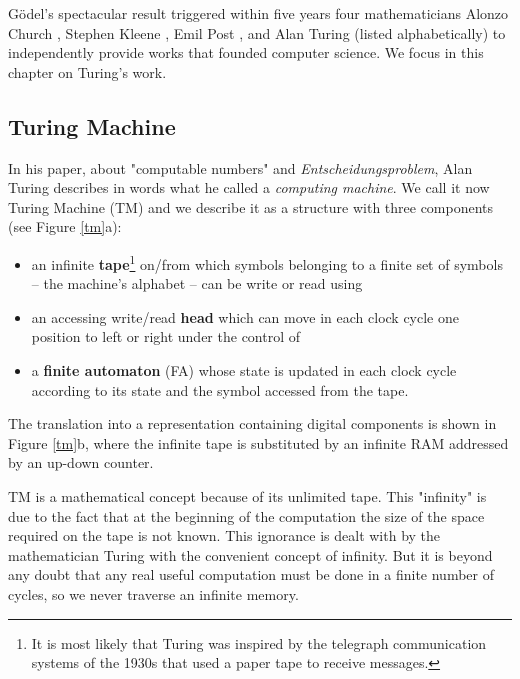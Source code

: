 Gödel's spectacular result triggered within five years four mathematicians Alonzo Church \cite{Church36}, Stephen Kleene \cite{Kleene36}, Emil Post \cite{Post36}, and Alan Turing \cite{Turing36, Turing1937} (listed alphabetically) to independently provide works that founded computer science. We focus in this chapter on Turing's work.

\subsection{Turing Machine}

In his paper, about "computable numbers" and {\em Entscheidungsproblem}, Alan Turing describes in words what he called a {\em computing machine}. We call it now Turing Machine (TM) and we describe it as a structure with three components (see Figure \ref{tm}a):
\begin{itemize}
    \item an infinite {\bf tape}\footnote{It is most likely that Turing was inspired by the telegraph communication systems of the 1930s that used a paper tape to receive messages.}  on/from which symbols belonging to a finite set of symbols -- the machine's alphabet -- can be write or read using
    \item an accessing write/read {\bf head} which can move in each clock cycle one position to left or right under the control of
    \item a {\bf finite automaton} (FA) whose state is updated in each clock cycle according to its state and the symbol accessed from the tape.
\end{itemize}
The translation into a representation containing digital components is shown in Figure \ref{tm}b, where the infinite tape is substituted by an infinite RAM addressed by an up-down counter. 


TM is a mathematical concept because of its unlimited tape. This "infinity" is due to the fact that at the beginning of the computation the size of the space required on the tape is not known. This ignorance is dealt with by the mathematician Turing with the convenient concept of infinity. But it is beyond any doubt that any real useful computation must be done in a finite number of cycles, so we never traverse an infinite memory.


